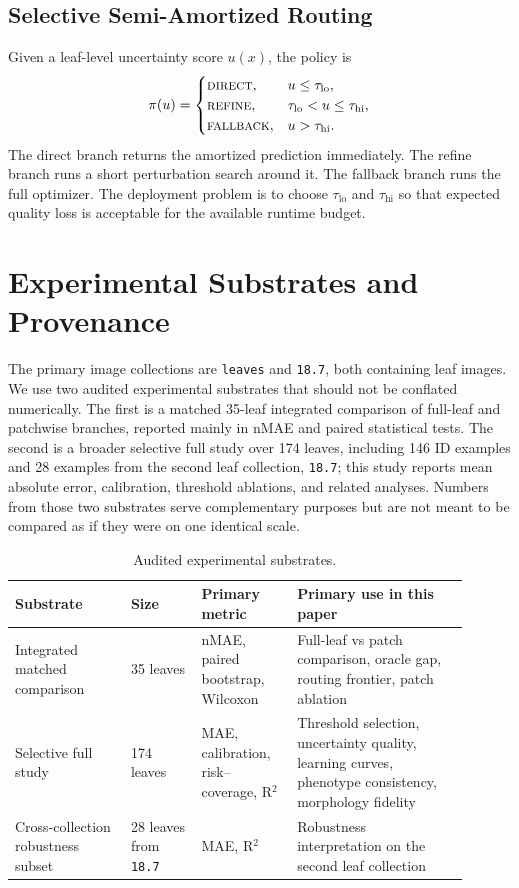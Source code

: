 \documentclass[11pt,a4paper]{article}
\newcommand{\nmae}{nMAE}
\begin{document}
\subsection{Selective Semi-Amortized Routing}
Given a leaf-level uncertainty score $u(x)$, the policy is
\begin{equation}
\pi(u)=
\begin{cases}
\textsc{direct}, & u\le \tau_{\mathrm{lo}},\\
\textsc{refine}, & \tau_{\mathrm{lo}}<u\le \tau_{\mathrm{hi}},\\
\textsc{fallback}, & u>\tau_{\mathrm{hi}}.
\end{cases}
\label{eq:routing}
\end{equation}
The direct branch returns the amortized prediction immediately.
The refine branch runs a short perturbation search around it.
The fallback branch runs the full optimizer.
The deployment problem is to choose $\tau_{\mathrm{lo}}$ and $\tau_{\mathrm{hi}}$ so that expected quality loss is acceptable for the available runtime budget.

\section{Experimental Substrates and Provenance}
The primary image collections are \texttt{leaves} and \texttt{18.7}, both containing leaf images.
We use two audited experimental substrates that should not be conflated numerically.
The first is a matched 35-leaf integrated comparison of full-leaf and patchwise branches, reported mainly in \nmae{} and paired statistical tests.
The second is a broader selective full study over 174 leaves, including 146 ID examples and 28 examples from the second leaf collection, \texttt{18.7}; this study reports mean absolute error, calibration, threshold ablations, and related analyses.
Numbers from those two substrates serve complementary purposes but are not meant to be compared as if they were on one identical scale.

\begin{table}[H]
\centering
\caption{Audited experimental substrates.}
\label{tab:substrates}
\small
\begin{tabular}{p{0.23\linewidth}p{0.14\linewidth}p{0.19\linewidth}p{0.34\linewidth}}
\toprule
Substrate & Size & Primary metric & Primary use in this paper \\
\midrule
Integrated matched comparison & 35 leaves & \nmae{}, paired bootstrap, Wilcoxon & Full-leaf vs patch comparison, oracle gap, routing frontier, patch ablation \\
Selective full study & 174 leaves & MAE, calibration, risk--coverage, R$^2$ & Threshold selection, uncertainty quality, learning curves, phenotype consistency, morphology fidelity \\
Cross-collection robustness subset & 28 leaves from \texttt{18.7} & MAE, R$^2$ & Robustness interpretation on the second leaf collection \\
\bottomrule
\end{tabular}
\end{table}
\end{document}
